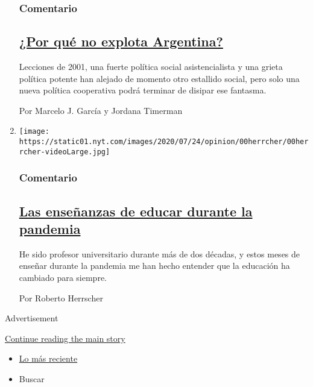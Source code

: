 \begin{enumerate}
  \hypertarget{comentario-2}{%
  \subsubsection{Comentario}\label{comentario-2}}

  \hypertarget{por-quuxe9-no-explota-argentina}{%
  \subsection{\texorpdfstring{\href{/es/2020/07/28/espanol/opinion/argentina-estallido-2001-coronavirus.html}{¿Por
  qué no explota
  Argentina?}}{¿Por qué no explota Argentina?}}\label{por-quuxe9-no-explota-argentina}}

  Lecciones de 2001, una fuerte política social asistencialista y una
  grieta política potente han alejado de momento otro estallido social,
  pero solo una nueva política cooperativa podrá terminar de disipar ese
  fantasma.

  Por Marcelo J. García y Jordana Timerman
\item
  \texttt{[image: https://static01.nyt.com/images/2020/07/24/opinion/00herrcher/00herrcher-videoLarge.jpg]}

  \hypertarget{comentario-3}{%
  \subsubsection{Comentario}\label{comentario-3}}

  \hypertarget{las-enseuxf1anzas-de-educar-durante-la-pandemia}{%
  \subsection{\texorpdfstring{\href{/es/2020/07/27/espanol/opinion/clases-universidad-coronavirus.html}{Las
  enseñanzas de educar durante la
  pandemia}}{Las enseñanzas de educar durante la pandemia}}\label{las-enseuxf1anzas-de-educar-durante-la-pandemia}}

  He sido profesor universitario durante más de dos décadas, y estos
  meses de enseñar durante la pandemia me han hecho entender que la
  educación ha cambiado para siempre.

  Por Roberto Herrscher
\end{enumerate}

Advertisement

\protect\hyperlink{after-mid1}{Continue reading the main story}

\begin{itemize}
\tightlist
\item
  \protect\hyperlink{stream-panel}{Lo más reciente}
\item
  Buscar
\end{itemize}

